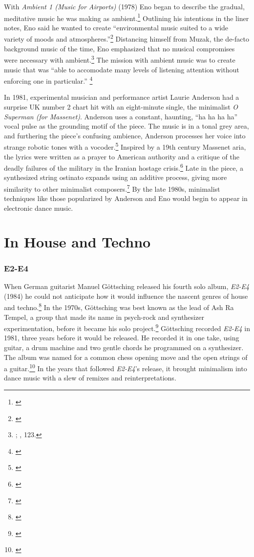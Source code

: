 \documentclass[12pt,twoside]{reedthesis}
\begin{document}
With \emph{Ambient 1 (Music for Airports)} (1978) Eno began to describe the gradual, meditative music he was making as ambient.\footnote{\cite{enoAmbientMusicAirports1978}} Outlining his intentions in the liner notes, Eno said he wanted to create ``environmental music suited to a wide variety of moods and atmospheres.''\footnote{\cite{enoMusicAirportsLiner}} Distancing himself from Muzak, the de-facto background music of the time, Eno emphasized that no musical compromises were necessary with ambient.\footnote{\cite{enoMusicAirportsLiner}; \cite{prendergastAmbientCenturyMahler2000}, 123.} The mission with ambient music was to create music that was ``able to accomodate many levels of listening attention without enforcing one in particular.'' \footnote{\cite{enoMusicAirportsLiner}}

In 1981, experimental musician and performance artist Laurie Anderson had a surprise UK number 2 chart hit with an eight-minute single, the minimalist \emph{O Superman (for Massenet)}. Anderson uses a constant, haunting, ``ha ha ha ha'' vocal pulse as the grounding motif of the piece. The music is in a tonal grey area, and furthering the piece's confusing ambience, Anderson processes her voice into strange robotic tones with a vocoder.\footnote{\cite{eckenrothOnceAgainMusic2014}} Inspired by a 19th century Massenet aria, the lyrics were written as a prayer to American authority and a critique of the deadly failures of the military in the Iranian hostage crisis.\footnote{\cite{davesimpsonHowWeMade2016}} Late in the piece, a synthesized string ostinato expands using an additive process, giving more similarity to other minimalist composers.\footnote{\cite{eckenrothOnceAgainMusic2014}}  By the late 1980s, minimalist techniques like those popularized by Anderson and Eno would begin to appear in electronic dance music.

\section{In House and Techno}

\subsubsection{E2-E4}

When German guitarist Manuel G{\"o}ttsching released his fourth solo album, \emph{E2-E4} (1984) he could not anticipate how it would influence the nascent genres of house and techno.\footnote{\cite{manuelgottschingE2E41984}} In the 1970s, G{\"o}ttsching was best known as the lead of Ash Ra Tempel, a group that made its name in psych-rock and synthesizer experimentation, before it became his solo project.\footnote{\cite{AshRaTempel}} G{\"o}ttsching recorded \emph{E2-E4} in 1981, three years before it would be released. He recorded it in one take, using guitar, a drum machine and two gentle chords he programmed on a synthesizer. The album was named for a common chess opening move and the open strings of a guitar.\footnote{\cite{d.straussManuelGottsching2006}} In the years that followed \emph{E2-E4}'s release, it brought minimalism into dance music with a slew of remixes and reinterpretations. 
\end{document}
